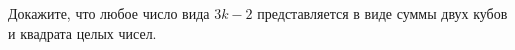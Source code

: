 Докажите, что любое число вида $3k - 2$ представляется в виде суммы двух кубов и квадрата целых чисел.